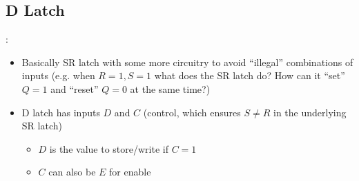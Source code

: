 \documentclass{../slides}
\begin{document}
\subsection{D Latch}
\begin{frame}{\secname: \subsecname}
    \begin{itemize}
        \item Basically SR latch with some more circuitry to avoid \enquote{illegal} combinations of inputs (e.g. when $R = 1, S = 1$ what does the SR latch do? How can it \enquote{set} $Q = 1$ and \enquote{reset} $Q = 0$ at the same time?)
        \item D latch has inputs $D$ and $C$ (control, which ensures $S\neq R$ in the underlying SR latch)
        \begin{itemize}
            \item $D$ is the value to store/write if $C = 1$
            \item $C$ can also be $E$ for enable
        \end{itemize}
    \end{itemize}
\end{frame}
\end{document}
